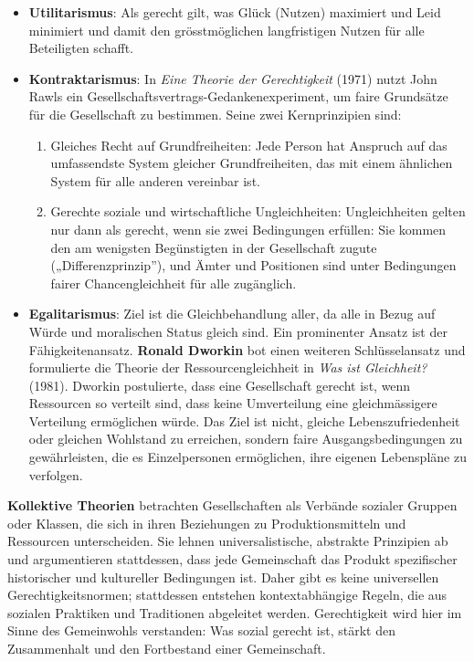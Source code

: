 \documentclass[
  nswissgerman,
  a4paper,
  openany]{book}
\begin{document}
\begin{tcolorbox}
\begin{itemize}
\item
  \textbf{Utilitarismus}: Als gerecht gilt, was Glück (Nutzen) maximiert
  und Leid minimiert und damit den grösstmöglichen langfristigen Nutzen
  für alle Beteiligten schafft.
\item
  \textbf{Kontraktarismus}: In \emph{Eine Theorie der Gerechtigkeit}
  (1971) nutzt John Rawls ein Gesellschaftsvertrags-Gedankenexperiment,
  um faire Grundsätze für die Gesellschaft zu bestimmen. Seine zwei
  Kernprinzipien sind:

  \begin{enumerate}
  \def\labelenumi{\arabic{enumi}.}
  \item
    Gleiches Recht auf Grundfreiheiten: Jede Person hat Anspruch auf das
    umfassendste System gleicher Grundfreiheiten, das mit einem
    ähnlichen System für alle anderen vereinbar ist.
  \item
    Gerechte soziale und wirtschaftliche Ungleichheiten: Ungleichheiten
    gelten nur dann als gerecht, wenn sie zwei Bedingungen erfüllen: Sie
    kommen den am wenigsten Begünstigten in der Gesellschaft zugute
    („Differenzprinzip''), und Ämter und Positionen sind unter
    Bedingungen fairer Chancengleichheit für alle zugänglich.
  \end{enumerate}
\item
  \textbf{Egalitarismus}: Ziel ist die Gleichbehandlung aller, da alle
  in Bezug auf Würde und moralischen Status gleich sind. Ein prominenter
  Ansatz ist der Fähigkeitenansatz. \textbf{Ronald Dworkin} bot einen
  weiteren Schlüsselansatz und formulierte die Theorie der
  Ressourcengleichheit in \emph{Was ist Gleichheit?} (1981). Dworkin
  postulierte, dass eine Gesellschaft gerecht ist, wenn Ressourcen so
  verteilt sind, dass keine Umverteilung eine gleichmässigere Verteilung
  ermöglichen würde. Das Ziel ist nicht, gleiche Lebenszufriedenheit
  oder gleichen Wohlstand zu erreichen, sondern faire
  Ausgangsbedingungen zu gewährleisten, die es Einzelpersonen
  ermöglichen, ihre eigenen Lebenspläne zu verfolgen.
\end{itemize}

\textbf{Kollektive Theorien} betrachten Gesellschaften als Verbände
sozialer Gruppen oder Klassen, die sich in ihren Beziehungen zu
Produktionsmitteln und Ressourcen unterscheiden. Sie lehnen
universalistische, abstrakte Prinzipien ab und argumentieren
stattdessen, dass jede Gemeinschaft das Produkt spezifischer
historischer und kultureller Bedingungen ist. Daher gibt es keine
universellen Gerechtigkeitsnormen; stattdessen entstehen
kontextabhängige Regeln, die aus sozialen Praktiken und Traditionen
abgeleitet werden. Gerechtigkeit wird hier im Sinne des Gemeinwohls
verstanden: Was sozial gerecht ist, stärkt den Zusammenhalt und den
Fortbestand einer Gemeinschaft.


\end{tcolorbox}
\end{document}
